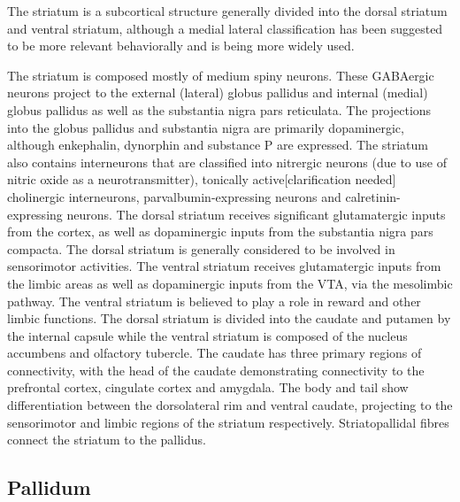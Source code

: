 \documentclass[]{book}
\begin{document}
The striatum is a subcortical structure generally divided into the dorsal striatum and ventral striatum, although a medial lateral classification has been suggested to be more relevant behaviorally and is being more widely used.

The striatum is composed mostly of medium spiny neurons. These GABAergic neurons project to the external (lateral) globus pallidus and internal (medial) globus pallidus as well as the substantia nigra pars reticulata. The projections into the globus pallidus and substantia nigra are primarily dopaminergic, although enkephalin, dynorphin and substance P are expressed. The striatum also contains interneurons that are classified into nitrergic neurons (due to use of nitric oxide as a neurotransmitter), tonically active{[}clarification needed{]} cholinergic interneurons, parvalbumin-expressing neurons and calretinin-expressing neurons. The dorsal striatum receives significant glutamatergic inputs from the cortex, as well as dopaminergic inputs from the substantia nigra pars compacta. The dorsal striatum is generally considered to be involved in sensorimotor activities. The ventral striatum receives glutamatergic inputs from the limbic areas as well as dopaminergic inputs from the VTA, via the mesolimbic pathway. The ventral striatum is believed to play a role in reward and other limbic functions. The dorsal striatum is divided into the caudate and putamen by the internal capsule while the ventral striatum is composed of the nucleus accumbens and olfactory tubercle. The caudate has three primary regions of connectivity, with the head of the caudate demonstrating connectivity to the prefrontal cortex, cingulate cortex and amygdala. The body and tail show differentiation between the dorsolateral rim and ventral caudate, projecting to the sensorimotor and limbic regions of the striatum respectively. Striatopallidal fibres connect the striatum to the pallidus.

\hypertarget{pallidum}{%
\subsection{Pallidum}\label{pallidum}}
\end{document}
